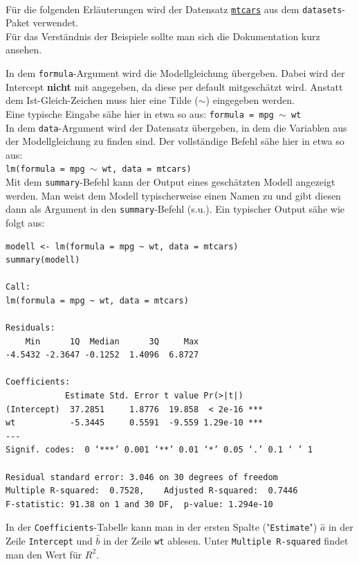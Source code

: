 \documentclass[a4paper]{article}
\newcommand\dangersign[1][2ex]{%
  \renewcommand\stacktype{L}%
  \scaleto{\stackon[1.3pt]{\color{red}$\triangle$}{\tiny !}}{#1}%
}
\begin{document}
\clearpage

\noindent {}\\

\noindent Für die folgenden Erläuterungen wird der Datensatz \href{https://www.rdocumentation.org/packages/datasets/versions/3.6.2/topics/mtcars}{\texttt{mtcars}} aus dem \texttt{datasets}-Paket verwendet.\\Für das Verständnis der Beispiele sollte man sich die Dokumentation kurz ansehen.

\noindent \dangersign[3ex] In dem \texttt{formula}-Argument wird die Modellgleichung übergeben. Dabei wird der Intercept \textbf{nicht} mit angegeben, da diese per default mitgeschätzt wird. Anstatt dem Ist-Gleich-Zeichen muss hier eine Tilde ($\sim$) eingegeben werden.\\
Eine typische Eingabe sähe hier in etwa so aus:
\texttt{formula = mpg $\sim$ wt}\\

\noindent \dangersign[3ex] In dem \texttt{data}-Argument wird der Datensatz übergeben, in dem die Variablen aus der Modellgleichung zu finden sind. Der vollständige Befehl sähe hier in etwa so aus:\\
\texttt{lm(formula = mpg $\sim$ wt, data = mtcars)}\\

\noindent \dangersign[3ex] Mit dem \texttt{summary}-Befehl kann der Output eines geschätzten Modell angezeigt werden. Man weist dem Modell typischerweise einen Namen zu und gibt diesen dann als Argument in den \texttt{summary}-Befehl (s.u.). Ein typischer Output sähe wie folgt aus:\\

\begin{small}
\begin{Verbatim}[frame=single]
modell <- lm(formula = mpg ~ wt, data = mtcars)
summary(modell)

Call:
lm(formula = mpg ~ wt, data = mtcars)

Residuals:
    Min      1Q  Median      3Q     Max 
-4.5432 -2.3647 -0.1252  1.4096  6.8727 

Coefficients:
            Estimate Std. Error t value Pr(>|t|)    
(Intercept)  37.2851     1.8776  19.858  < 2e-16 ***
wt           -5.3445     0.5591  -9.559 1.29e-10 ***
---
Signif. codes:  0 ‘***’ 0.001 ‘**’ 0.01 ‘*’ 0.05 ‘.’ 0.1 ‘ ’ 1

Residual standard error: 3.046 on 30 degrees of freedom
Multiple R-squared:  0.7528,	Adjusted R-squared:  0.7446 
F-statistic: 91.38 on 1 and 30 DF,  p-value: 1.294e-10
\end{Verbatim}
\end{small}
In der \texttt{Coefficients}-Tabelle kann man in der ersten Spalte ("\texttt{Estimate}") $\hat a$ in der Zeile \texttt{Intercept} und $\hat b$ in der Zeile \texttt{wt} ablesen. Unter \texttt{Multiple R-squared} findet man den Wert für $R^2$.\\
\end{document}
